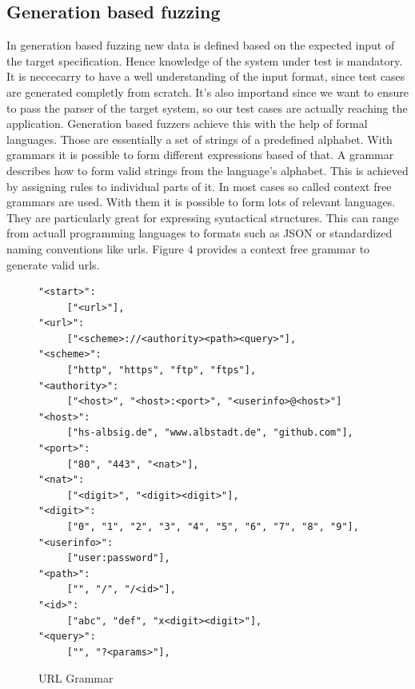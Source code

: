 \documentclass[journal=tosc,final]{iacrtrans}
\begin{document}
\subsection{Generation based fuzzing}
In generation based fuzzing new data is defined based on the expected input of the target specification. Hence knowledge of the system under test is mandatory. It is neccecarry to have a well understanding of the input format, since test cases are generated completly from scratch. It's also importand since we want to ensure to pass the parser of the target system, so our test cases are actually reaching the application.
Generation based fuzzers achieve this with the help of formal languages. Those are essentially a set of strings of a predefined alphabet. With grammars it is possible to form different expressions based of that. A grammar describes how to form valid strings from the language's alphabet. This is achieved by assigning rules to individual parts of it.
In most cases so called context free grammars are used. With them it is possible to form lots of relevant languages. They are particularly great for expressing syntactical structures. This can range from actuall programming languages to formats such as JSON or standardized naming conventions like urls. Figure 4 provides a context free grammar to generate valid urls.
\begin{figure}[h]
 \caption{URL Grammar}
 \begin{center}
\begin{shaded}
\begin{internallinenumbers}
\begin{verbatim}
"<start>":
     ["<url>"],
"<url>":
     ["<scheme>://<authority><path><query>"],
"<scheme>":
     ["http", "https", "ftp", "ftps"],
"<authority>":
     ["<host>", "<host>:<port>", "<userinfo>@<host>"]
"<host>":  
     ["hs-albsig.de", "www.albstadt.de", "github.com"],
"<port>":
     ["80", "443", "<nat>"],
"<nat>":
     ["<digit>", "<digit><digit>"],
"<digit>":
     ["0", "1", "2", "3", "4", "5", "6", "7", "8", "9"],
"<userinfo>":  
     ["user:password"],
"<path>":  
     ["", "/", "/<id>"],
"<id>":  
     ["abc", "def", "x<digit><digit>"],
"<query>":
     ["", "?<params>"],
\end{verbatim}
\end{internallinenumbers}
\end{shaded}
\end{center}

\end{figure}
\end{document}
